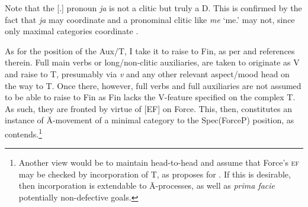\documentclass[output=paper]{langsci/langscibook}
\begin{document}
\begin{exe}
	\ex
	\label{tree1}
\end{exe}

Note that the [\Fsg.\Nom{}] pronoun \emph{ja} is not a clitic but truly a
D. This is confirmed by the fact that \emph{ja} may
coordinate and a pronominal clitic like \emph{me} `me.\Acc{}' may
not, since only maximal categories coordinate \citep{Kayne1994}.

As for the position of the Aux/T, I take it to raise to
Fin, as per \citet[396]{roberts:2012uq} and references
therein. Full main verbs or long/non-clitic auxiliaries, are taken to originate
as V and raise to T, presumably via
\emph{v} and any other relevant aspect/mood head on the way to
T. Once there, however, full verbs and full auxiliaries
are not assumed to be able to raise to Fin as
Fin lacks the V-feature specified on the complex
T. As such, they are fronted by virtue of [\gls{EF}] on
Force. This, then, constitutes an instance of Ā-movement
of a minimal category to the Spec(ForceP) position, as
\citet[396]{roberts:2012uq} contends.\footnote{Another view would be to
maintain head-to-head  and assume that Force's \textsc{ef} may be
checked by incorporation of T, as \citet{roberts:2012uq}
proposes for . If this is desirable, then incorporation is
extendable to Ā-processes, as well as \emph{prima facie} potentially
non-defective goals.}
\end{document}

